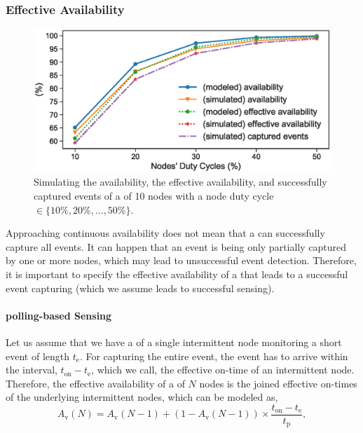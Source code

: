 \subsubsection{Effective Availability}
%
\begin{figure}
		\centering
		\includegraphics[width=\columnwidth]{figures/effective_availability}
		\caption{Simulating the availability, the effective availability, and successfully captured events of a \cis of 10 nodes with a node duty cycle $\in \{10\%, 20\%,...,50\%\}$.}
		\label{fig:cis_simulation}
\end{figure}
%
Approaching continuous availability does not mean that a \cis can successfully capture all events. It can happen that an event is being only partially captured by one or more nodes, which may lead to unsuccessful event detection. Therefore, it is important to specify the effective availability of a \cis that leads to a successful event capturing (which we assume leads to successful sensing). 

\paragraph{polling-based Sensing}
Let us assume that we have a \cis of a single intermittent node monitoring a short event of length $t_\text{e}$. For capturing the entire event, the event has to arrive within the interval, $t_\text{on} - t_\text{e}$, which we call, the effective on-time of an intermittent node.
Therefore, the effective availability of a \cis of $N$ nodes is the joined effective on-times of the underlying intermittent nodes, which can be modeled as,
%
\begin{equation}
		A_\text{v}(N) = A_\text{v}(N-1) + \left(1-A_\text{v}(N-1)\right) \times \frac{t_\text{on} - t_\text{e}}{t_\text{p}},
		\label{eq:cisSenseModel}
\end{equation} 
%

